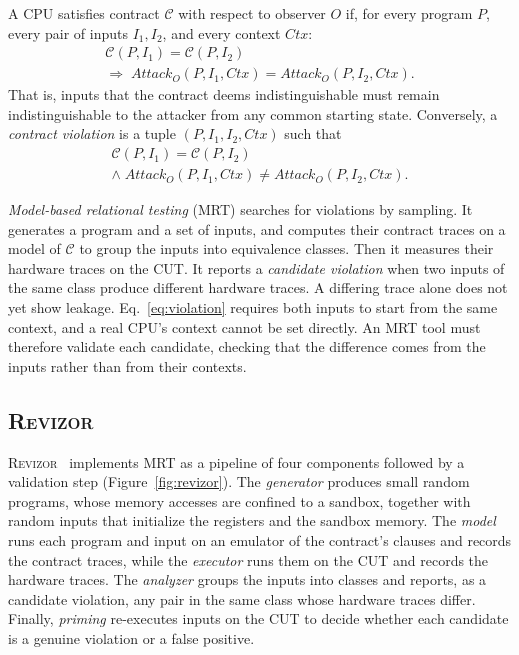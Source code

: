 \documentclass[letterpaper,twocolumn,10pt]{article}
\theoremstyle{definition}
\providecommand{\obs}{\ensuremath{O}}
\providecommand{\At}[1]{\ensuremath{\mathit{Attack}_{#1}}}
\begin{document}
\noindent A CPU satisfies contract $\mathcal{C}$ with respect to observer $\obs$
if, for every program $P$, every pair of inputs $I_1,I_2$, and every context
$\mathit{Ctx}$:
\begin{equation}
\begin{gathered}
\mathcal{C}(P,I_1) = \mathcal{C}(P,I_2) \\
\Longrightarrow\;
\At{\obs}(P,I_1,\mathit{Ctx}) = \At{\obs}(P,I_2,\mathit{Ctx}).
\end{gathered}
\label{eq:contract}
\end{equation}
\noindent That is, inputs that the contract deems indistinguishable must remain
indistinguishable to the attacker from any common starting state. Conversely,
a \emph{contract violation} is a tuple $(P,I_1,I_2,\mathit{Ctx})$ such that
\begin{equation}
\begin{gathered}
\mathcal{C}(P,I_1) = \mathcal{C}(P,I_2) \\
\land\;
\At{\obs}(P,I_1,\mathit{Ctx}) \neq \At{\obs}(P,I_2,\mathit{Ctx}).
\end{gathered}
\label{eq:violation}
\end{equation}

\noindent \emph{Model-based relational testing} (MRT) searches for violations by sampling. It generates a
program and a set of inputs, and computes their contract traces on a model of $\mathcal{C}$ to
group the inputs into equivalence classes. Then it measures their hardware traces on the CUT.
It reports a \emph{candidate violation} when two inputs of the same class produce different
hardware traces. A differing trace alone does not yet show leakage.
Eq.~\eqref{eq:violation} requires both inputs to start from the same context, and a real
CPU's context cannot be set directly. An MRT tool must therefore validate each candidate,
checking that the difference comes from the inputs rather than from their contexts.

\subsection{\textsc{Revizor}}
\label{sec:background-revizor}
 
\textsc{Revizor}~\cite{revizor} implements MRT as a pipeline of four components followed by a
validation step (Figure~\ref{fig:revizor}). The \emph{generator} produces small random
programs, whose memory accesses are confined to a sandbox, together with random inputs that
initialize the registers and the sandbox memory. The \emph{model} runs each program and input
on an emulator of the contract's clauses and records the contract traces, while the
\emph{executor} runs them on the CUT and records the hardware traces. The \emph{analyzer}
groups the inputs into classes and reports, as a candidate violation, any pair in the
same class whose hardware traces differ. Finally, \emph{priming} re-executes inputs on
the CUT to decide whether each candidate is a genuine violation or a false positive.
 
\end{document}
